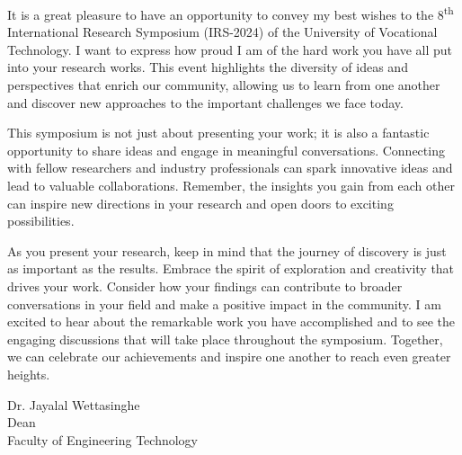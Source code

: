 \thispagestyle{fancy}
	




   
    



		It is a great pleasure to have an opportunity to convey my best wishes to the 8\textsuperscript{th} International Research Symposium (IRS-2024) of the University of Vocational Technology. I want to express how proud I am of the hard work you have all put into your research works. This event highlights the diversity of ideas and perspectives that enrich our community, allowing us to learn from one another and discover new approaches to the important challenges we face today.
        
This symposium is not just about presenting your work; it is also a fantastic opportunity to share ideas and engage in meaningful conversations. Connecting with fellow researchers and industry professionals can spark innovative ideas and lead to valuable collaborations. Remember, the insights you gain from each other can inspire new directions in your research and open doors to exciting possibilities.

As you present your research, keep in mind that the journey of discovery is just as important as the results. Embrace the spirit of exploration and creativity that drives your work. Consider how your findings can contribute to broader conversations in your field and make a positive impact in the community. I am excited to hear about the remarkable work you have accomplished and to see the engaging discussions that will take place throughout the symposium. Together, we can celebrate our achievements and inspire one another to reach even greater heights.

	\vspace{1cm}
	\noindent
	Dr. Jayalal Wettasinghe\\
Dean\\
Faculty of Engineering Technology
	
	\newpage
